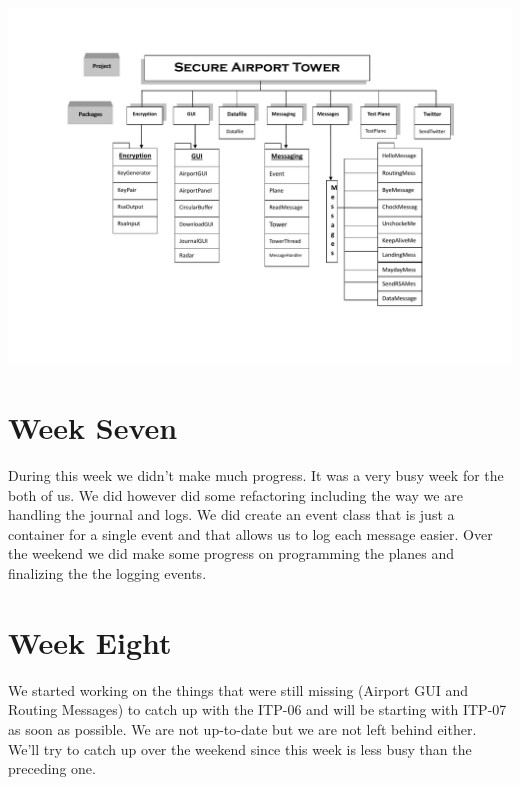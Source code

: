 \documentclass{article}
\begin{document}
\includegraphics[scale=0.45]{UML.pdf}
\newpage

\section{Week Seven}
During this week we didn't make much progress. It was a very busy week for the both of us. We did however did some refactoring including the way we are handling the journal and logs. We did create an event class that is just a container for a single event and that allows us to log each message easier. Over the weekend we did make some progress on programming the planes and finalizing the the logging events.
\section{Week Eight}
We started working on the things that were still missing (Airport GUI and Routing Messages) to catch up with the ITP-06 and will be starting with ITP-07 as soon as possible. We are not up-to-date but we are not left behind either. We'll try to catch up over the weekend since this week is less busy than the preceding one.
\end{document}
